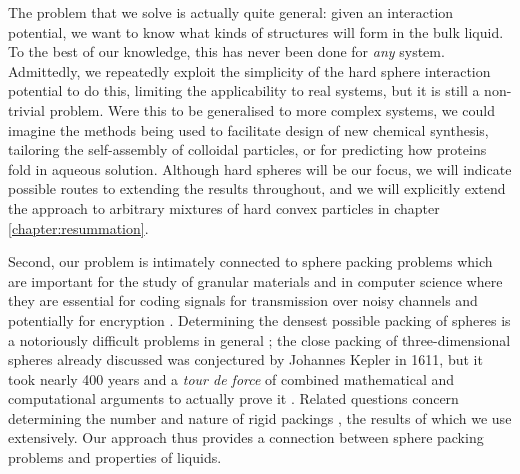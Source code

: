\documentclass[11pt,twoside]{report}
\begin{document}
The problem that we solve is actually quite general: given an interaction potential, we want to know what kinds of structures will form in the bulk liquid.
To the best of our knowledge, this has never been done for \emph{any} system.
Admittedly, we repeatedly exploit the simplicity of the hard sphere interaction potential to do this, limiting the applicability to real systems, but it is still a non-trivial problem.
Were this to be generalised to more complex systems, we could imagine the methods being used to facilitate design of new chemical synthesis, tailoring the self-assembly of colloidal particles, or for predicting how proteins fold in aqueous solution.
Although hard spheres will be our focus, we will indicate possible routes to extending the results throughout, and we will explicitly extend the approach to arbitrary mixtures of hard convex particles in chapter \ref{chapter:resummation}.

Second, our problem is intimately connected to sphere packing problems which are important for the study of granular materials and in computer science where they are essential for coding signals for transmission over noisy channels and potentially for encryption%
.
Determining the densest possible packing of spheres is a notoriously difficult problems in general \cite{Cohn2016,Conway1999}; the close packing of three-dimensional spheres already discussed was conjectured by Johannes Kepler in 1611, but it took nearly 400 years and a \emph{tour de force} of combined mathematical and computational arguments to actually prove it \cite{HalesAM2005}.
Related questions concern determining the number and nature of rigid packings \cite{Conway1999,Holmes-CerfonSR2016,Holmes-CerfonARCMP2017}, the results of which we use extensively.
Our approach thus provides a connection between sphere packing problems and properties of liquids.
\end{document}
